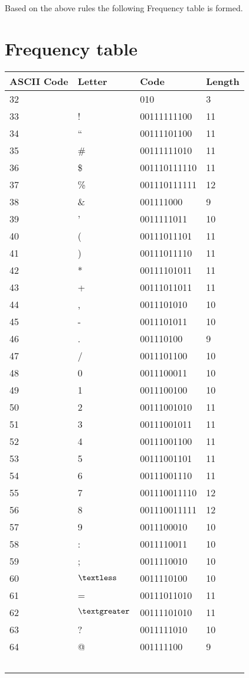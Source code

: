 \documentclass[]{article}
\begin{document}
Based on the above rules the following Frequency table is formed.

\section{Frequency table}

\begin{center}
\begin{tabular}{ | l | l | l | l |} \hline
	﻿\textbf{ASCII Code} & ﻿\textbf{Letter} & ﻿\textbf{Code} & ﻿\textbf{Length} \\ \hline
        32 &   & 010 & 3 \\ \hline
		33 & ! & 00111111100 & 11 \\ \hline
		34 & \textquotedblleft & 00111101100 & 11 \\ \hline
		35 & \# & 00111111010 & 11 \\ \hline
		36 & \$ & 001110111110 & 11 \\ \hline
		37 & \% & 001110111111 & 12 \\ \hline
		38 & \& & 001111000    & 9 \\ \hline
		39 & '  & 0011111011   & 10 \\ \hline
		40 & (  & 00111011101  & 11 \\ \hline
		41 & )  & 00111011110  & 11 \\ \hline
		42 & *  & 00111101011  & 11 \\ \hline
		43 & +  & 00111011011  & 11 \\ \hline
		44 & ,  & 0011101010   & 10 \\ \hline
		45 & -  & 0011101011   & 10 \\ \hline
		46 & .  & 001110100    & 9 \\ \hline
		47 & /  & 0011101100   & 10 \\ \hline
		48 & 0  & 0011100011   & 10 \\ \hline
		49 & 1  & 0011100100   & 10 \\ \hline
		50 & 2  & 00111001010  & 11 \\ \hline
		51 & 3  & 00111001011  & 11 \\ \hline
		52 & 4  & 00111001100  & 11 \\ \hline
		53 & 5  & 00111001101  & 11 \\ \hline
		54 & 6  & 00111001110  & 11 \\ \hline
		55 & 7  & 001110011110 & 12 \\ \hline
		56 & 8  & 001110011111 & 12 \\ \hline
		57 & 9  & 0011100010   & 10 \\ \hline
		58 & :  & 0011110011   & 10 \\ \hline
		59 & ;  & 0011110010   & 10 \\ \hline
		60 & $\textless$ & 0011110100 & 10 \\ \hline
		61 & = & 00111011010 & 11 \\ \hline
		62 & $\textgreater$ & 00111101010 & 11 \\ \hline
		63 & ? & 0011111010 & 10 \\ \hline
		64 & @ & 001111100 & 9 \\ \hline
	﻿\end{tabular}
\end{center}
\end{document}
